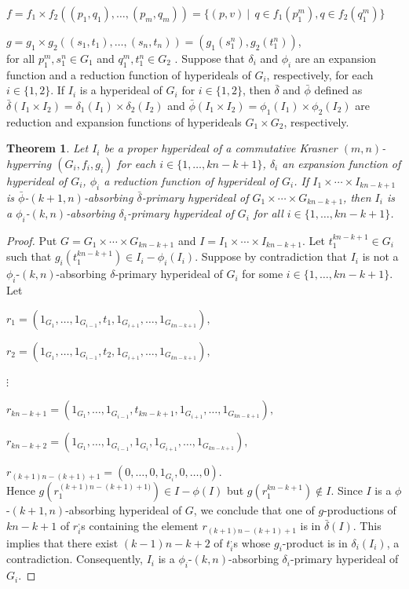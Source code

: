 \documentclass[preprint,review,10pt]{amsart}
\newtheorem{theorem}{Theorem}[section]
\theoremstyle{definition}
\theoremstyle{remark}
\numberwithin{equation}{section}
\begin{document}
$f=f_1 \times f_2((p_{1}, q_{1}),\ldots,(p_m,q_m)) = \{(p,v) \ \vert \ \ q \in f_1(p_1^m), q \in f_2(q_1^m) \}$


$g=g_1 \times g_2 ((s_1,t_1),\ldots,(s_n,t_n)) =(g_1(s_1^n),g_2(t_1^n)) $,\\
for all $p_1^m,s_1^n \in G_1$ and $q_1^m,t_1^n \in G_2$ \cite{car}. Suppose that $\delta_i$ and $\phi_i$ are an expansion  function  
 and a reduction function of hyperideals of $G_i$, respectively, for each $i \in \{1,2\}$. If $I_i$ is a hyperideal of $G_i$ for $i \in \{1,2\}$, then $\bar{\delta}$ and $\bar{\phi}$ defined as $\bar{\delta}(I_1 \times I_2)=\delta_1(I_1) \times \delta_2(I_2)$ and $\bar{\phi}(I_1 \times I_2)=\phi_1(I_1) \times \phi_2(I_2)$ are reduction and expansion functions of hyperideals $G_1 \times G_2$, respectively.

 \begin{theorem} \label{car}
 Let $I_i$ be a proper hyperideal of    a commutative
Krasner $(m,n)$-hyperring $(G_i,f_i,g_i)$ for each $i \in \{1,\ldots,kn-k+1\}$, $\delta_i $ an expansion function of hyperideal of $G_i$,  $\phi_i$  a reduction function of hyperideal  of $G_i$.   If $I_1\times \cdots \times I_{kn-k+1}$ is $\bar{\phi}$-$(k+1,n)$-absorbing $\bar{\delta}$-primary hyperideal of $G_1\times \cdots \times G_{kn-k+1}$, then $I_i$ is a   $\phi_i$-$(k,n)$-absorbing $\delta_i$-primary hyperideal of $G_i$ for all $i \in \{1,\ldots,kn-k+1\}$.
 \end{theorem}
\begin{proof}
Put $G=G_1\times \cdots \times G_{kn-k+1}$ and $I=I_1\times \cdots \times I_{kn-k+1}$. Let $t_1^{kn-k+1} \in G_i$ such that $g_i(t_1^{kn-k+1}) \in I_i-\phi_i(I_i)$. Suppose by contradiction that $I_i$ is not a $\phi_i$-$(k,n)$-absorbing $\delta$-primary hyperideal of $G_i$ for some $i \in \{1,\ldots,kn-k+1\}$. Let

$r_1=(1_{G_1},\ldots, 1_{G_{i-1}},t_1,1_{G_{i+1}},\ldots, 1_{G_{kn-k+1}}),$

$ r_2=(1_{G_1},\ldots, 1_{G_{i-1}},t_2,1_{G_{i+1}},\ldots, 1_{G_{kn-k+1}}),$

$\vdots$

$r_{kn-k+1}=(1_{G_1},\ldots, 1_{G_{i-1}},t_{kn-k+1},1_{G_{i+1}},\ldots,1_{G_{kn-k+1}}), $

$r_{kn-k+2}=(1_{G_1},\ldots, 1_{G_{i-1}},1_{G_i},1_{G_{i+1}},\ldots,1_{G_{kn-k+1}}),$

$ r_{(k+1)n-(k+1)+1}=(0,\ldots, 0,1_{G_i},0,\ldots,0)$.\\
Hence $g(r_1^{(k+1)n-(k+1)+1)}) \in I-\phi(I)$ but $g(r_1^{kn-k+1}) \notin I$. Since $I$ is a $\phi$-$(k+1,n)$-absorbing hyperideal of $G$,  we conclude that one of $g$-productions of $kn-k+1$ of $r_i^,$s containing the element $ r_{(k+1)n-(k+1)+1}$ is in $\bar{\delta}(I)$. This implies that there exist $(k-1)n-k+2$ of $t_i^,$s whose $g_i$-product is in $\delta_i(I_i)$, a contradiction. Consequently,  $I_i$ is a $\phi_i$-$(k,n)$-absorbing $\delta_i$-primary hyperideal of $G_i$.
\end{proof}
\end{document}

